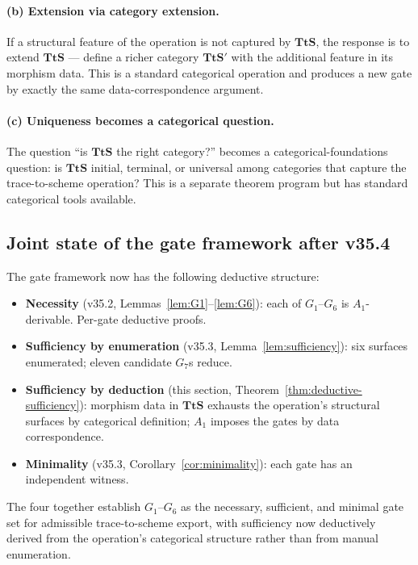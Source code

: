 \paragraph{(b) Extension via category extension.} If a structural feature of the operation is not captured by $\mathbf{TtS}$, the response is to extend $\mathbf{TtS}$ — define a richer category $\mathbf{TtS}'$ with the additional feature in its morphism data. This is a standard categorical operation and produces a new gate by exactly the same data-correspondence argument.

\paragraph{(c) Uniqueness becomes a categorical question.} The question ``is $\mathbf{TtS}$ the right category?'' becomes a categorical-foundations question: is $\mathbf{TtS}$ initial, terminal, or universal among categories that capture the trace-to-scheme operation? This is a separate theorem program but has standard categorical tools available.

\subsection{Joint state of the gate framework after v35.4}
\label{subsec:post-v35-4}

The gate framework now has the following deductive structure:

\begin{itemize}
\item \textbf{Necessity} (v35.2, Lemmas~\ref{lem:G1}--\ref{lem:G6}): each of $G_1$--$G_6$ is $A_1$-derivable. Per-gate deductive proofs.
\item \textbf{Sufficiency by enumeration} (v35.3, Lemma~\ref{lem:sufficiency}): six surfaces enumerated; eleven candidate $G_7$s reduce.
\item \textbf{Sufficiency by deduction} (this section, Theorem~\ref{thm:deductive-sufficiency}): morphism data in $\mathbf{TtS}$ exhausts the operation's structural surfaces by categorical definition; $A_1$ imposes the gates by data correspondence.
\item \textbf{Minimality} (v35.3, Corollary~\ref{cor:minimality}): each gate has an independent witness.
\end{itemize}

The four together establish $G_1$--$G_6$ as the necessary, sufficient, and minimal gate set for admissible trace-to-scheme export, with sufficiency now deductively derived from the operation's categorical structure rather than from manual enumeration.

